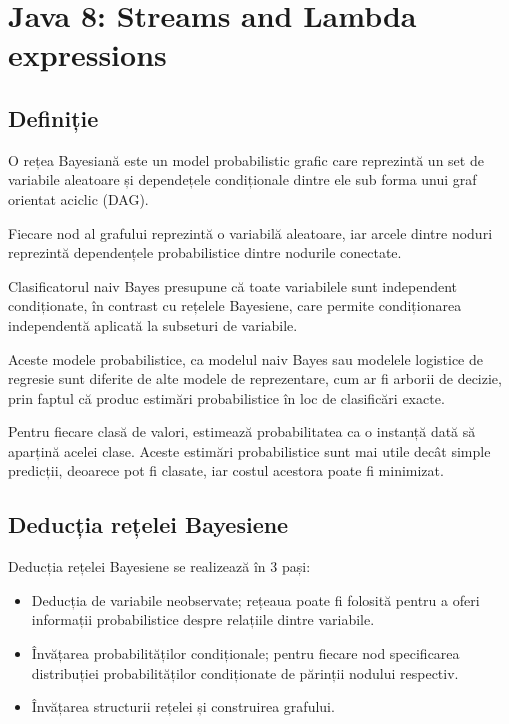
\chapter{Java 8: Streams and Lambda expressions} %

\label{Chapter2} %

\section{Definiție}

O rețea Bayesiană este un model probabilistic grafic care reprezintă un set de variabile aleatoare și dependețele condiționale dintre ele sub forma unui graf orientat aciclic (DAG).

Fiecare nod al grafului reprezintă o variabilă aleatoare, iar arcele dintre noduri reprezintă dependențele probabilistice dintre nodurile conectate.

Clasificatorul naiv Bayes presupune că toate variabilele sunt independent condiționate, în contrast cu rețelele Bayesiene, care permite condiționarea independentă aplicată la subseturi de variabile.

Aceste modele probabilistice, ca modelul naiv Bayes sau modelele logistice de regresie sunt diferite de alte modele de reprezentare, cum ar fi arborii de decizie, prin faptul că produc estimări probabilistice în loc de clasificări exacte.

Pentru fiecare clasă de valori, estimează probabilitatea ca o instanță dată să aparțină acelei clase.
Aceste estimări probabilistice sunt mai utile decât simple predicții, deoarece pot fi clasate, iar costul acestora poate fi minimizat.

\section{Deducția rețelei Bayesiene}

Deducția rețelei Bayesiene se realizează în 3 pași:
\begin{itemize}
\item Deducția de variabile neobservate; rețeaua poate fi folosită pentru a oferi informații probabilistice despre relațiile dintre variabile.
\item Învățarea probabilităților condiționale; pentru fiecare nod specificarea distribuției probabilităților condiționate de părinții nodului respectiv.
\item Învățarea structurii rețelei și construirea grafului.
\end{itemize}

